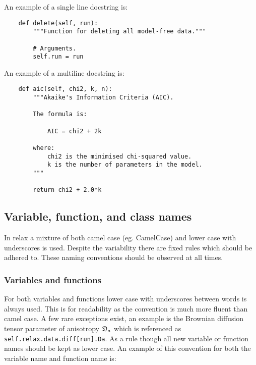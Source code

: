 An example of a single line docstring is:

\begin{footnotesize}
\begin{verbatim}
    def delete(self, run):
        """Function for deleting all model-free data."""

        # Arguments.
        self.run = run
\end{verbatim}
\end{footnotesize}

An example of a multiline docstring is:

\begin{footnotesize}
\begin{verbatim}
    def aic(self, chi2, k, n):
        """Akaike's Information Criteria (AIC).

        The formula is:

            AIC = chi2 + 2k

        where:
            chi2 is the minimised chi-squared value.
            k is the number of parameters in the model.
        """

        return chi2 + 2.0*k
\end{verbatim}
\end{footnotesize}


\subsection{Variable, function, and class names}

In relax a mixture of both camel case (eg. CamelCase) and lower case with underscores is used.  Despite the variability there are fixed rules which should be adhered to.  These naming conventions should be observed at all times.



\subsubsection{Variables and functions}

For both variables and functions lower case with underscores between words is always used.  This is for readability as the convention is much more fluent than camel case.  A few rare exceptions exist, an example is the Brownian diffusion tensor parameter of anisotropy $\mathfrak{D}_a$ which is referenced as \texttt{self.relax.data.diff[run].Da}.  As a rule though all new variable or function names should be kept as lower case.  An example of this convention for both the variable name and function name is:


